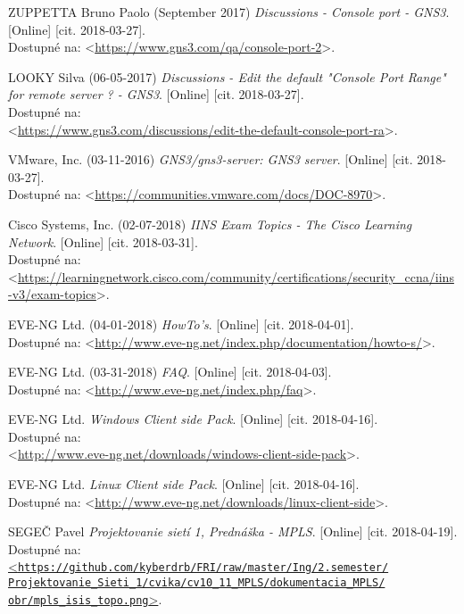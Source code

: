 \begin{thebibliography}{99}
ZUPPETTA Bruno Paolo (September 2017) {\it Discussions - Console port - GNS3}. [Online] [cit. 2018-03-27]. \\
Dostupné na: <\url{https://www.gns3.com/qa/console-port-2}>.

LOOKY Silva (06-05-2017) {\it Discussions - Edit the default "Console Port Range" for remote server ? - GNS3}. [Online] [cit. 2018-03-27]. \\
Dostupné na: \\
<\url{https://www.gns3.com/discussions/edit-the-default-console-port-ra}>.

VMware, Inc. (03-11-2016) {\it GNS3/gns3-server: GNS3 server}. [Online] [cit. 2018-03-27]. \\
Dostupné na: <\url{https://communities.vmware.com/docs/DOC-8970}>.

Cisco Systems, Inc. (02-07-2018) {\it IINS Exam Topics - The Cisco Learning Network}. [Online] [cit. 2018-03-31]. \\
Dostupné na: \\
<\url{https://learningnetwork.cisco.com/community/certifications/security_ccna/iins-v3/exam-topics}>.

EVE-NG Ltd. (04-01-2018) {\it HowTo's}. [Online] [cit. 2018-04-01]. \\
Dostupné na: <\url{http://www.eve-ng.net/index.php/documentation/howto-s/}>.

EVE-NG Ltd. (03-31-2018) {\it FAQ}. [Online] [cit. 2018-04-03]. \\
Dostupné na: <\url{http://www.eve-ng.net/index.php/faq}>.

EVE-NG Ltd. {\it Windows Client side Pack}. [Online] [cit. 2018-04-16]. \\
Dostupné na: \\
<\url{http://www.eve-ng.net/downloads/windows-client-side-pack}>.

EVE-NG Ltd. {\it Linux Client side Pack}. [Online] [cit. 2018-04-16]. \\
Dostupné na: <\url{http://www.eve-ng.net/downloads/linux-client-side}>.

SEGEČ Pavel {\it Projektovanie sietí 1, Prednáška - MPLS}. [Online] [cit. 2018-04-19]. \\
Dostupné na:\\
\href{https://github.com/kyberdrb/FRI/raw/master/Ing/2.semester/Projektovanie_Sieti_1/cvika/cv10_11_MPLS/dokumentacia_MPLS/obr/mpls_isis_topo.png}{<\texttt{https://github.com/kyberdrb/FRI/raw/master/Ing/2.semester/\\Projektovanie\_Sieti\_1/cvika/cv10\_11\_MPLS/dokumentacia\_MPLS/\\
obr/mpls\_isis\_topo.png}>}.


\end{thebibliography}
